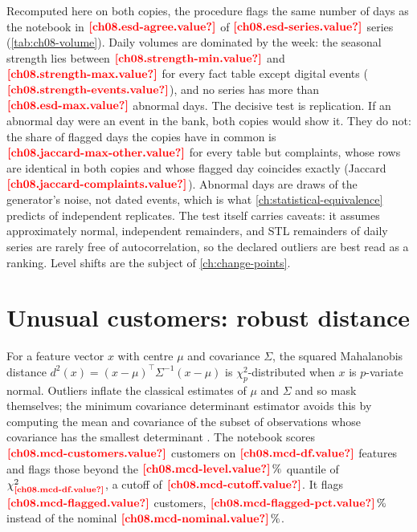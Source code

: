 Recomputed here on both copies, the procedure flags the same number of days as the notebook in
$\est{ch08.esd-agree}{value}$ of $\est{ch08.esd-series}{value}$ series (\cref{tab:ch08-volume}). Daily volumes are
dominated by the week: the seasonal strength lies between $\est{ch08.strength-min}{value}$ and
$\est{ch08.strength-max}{value}$ for every fact table except digital events ($\est{ch08.strength-events}{value}$),
and no series has more than $\est{ch08.esd-max}{value}$ abnormal days. The decisive test is replication. If an abnormal
day were an event in the bank, both copies would show it. They do not: the share of flagged days the copies have in
common is $\est{ch08.jaccard-max-other}{value}$ for every table but complaints, whose rows are identical in both copies
and whose flagged day coincides exactly (Jaccard $\est{ch08.jaccard-complaints}{value}$). Abnormal days are draws of the
generator's noise, not dated events, which is what \cref{ch:statistical-equivalence} predicts of independent
replicates. The test itself carries caveats: it assumes approximately normal, independent remainders, and STL
remainders of daily series are rarely free of autocorrelation, so the declared outliers are best read as a ranking. Level
shifts are the subject of \cref{ch:change-points}.



\section{Unusual customers: robust distance}\label{sec:ad-mcd}

For a feature vector $x$ with centre $\mu$ and covariance $\Sigma$, the squared Mahalanobis distance
$d^2(x) = (x - \mu)^\top \Sigma^{-1} (x - \mu)$ is $\chi^2_p$-distributed when $x$ is $p$-variate normal. Outliers
inflate the classical estimates of $\mu$ and $\Sigma$ and so mask themselves; the minimum covariance determinant
estimator avoids this by computing the mean and covariance of the subset of observations whose covariance has the
smallest determinant \autocite{rousseeuw1984,rousseeuw1999}. The notebook scores
$\est{ch08.mcd-customers}{value}$ customers on $\est{ch08.mcd-df}{value}$ features and flags those beyond the
$\est{ch08.mcd-level}{value}\,\%$ quantile of $\chi^2_{\est{ch08.mcd-df}{value}}$, a cutoff of
$\est{ch08.mcd-cutoff}{value}$. It flags $\est{ch08.mcd-flagged}{value}$ customers, $\est{ch08.mcd-flagged-pct}{value}\,\%$
instead of the nominal $\est{ch08.mcd-nominal}{value}\,\%$.

